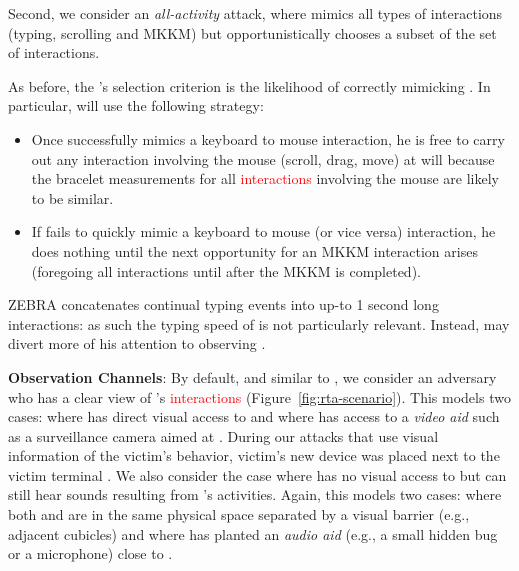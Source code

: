 \documentclass[conference]{IEEEtran}
\newcommand{\zebra}{ZEBRA\xspace}
\newcommand{\allactivity}{all-activity\xspace}
\newcommand{\attacker}{\xspace}
\newcommand{\victim}{\xspace}
\newcommand{\attackedterminal}{\xspace}
\newcommand{\victimdevice}{\xspace}
\newif\ifllncs
\newcommand\changeAsokan[1]{\textcolor{red}{#1}}
\newcommand\changeAsokan[1]{{#1}}
\begin{document}
Second, we consider an \textit{\allactivity} attack, where 
\attacker mimics
all types of interactions (typing, scrolling and MKKM) but
opportunistically chooses a subset of the set of interactions.
\ifllncs
This opportunistic strategy is described in detail in Appendix~\ref{app:extra_attackers}.
\else
As before, the \attacker's selection
criterion is the likelihood of correctly mimicking \victim. In
particular, \attacker will use the following strategy:
\begin{itemize}
\itemsep0em
\item Once \attacker successfully mimics a keyboard to mouse interaction, he
  is free to carry out any interaction involving the mouse (scroll,
  drag, move) at will because the bracelet measurements for all
  \changeAsokan{interactions} involving the mouse are likely to be similar.
\item If \attacker fails to quickly mimic a keyboard to mouse (or vice
  versa) interaction, he
  does nothing until the next opportunity for an MKKM
  interaction arises (foregoing all interactions until after the MKKM
  is completed).
\end{itemize}
\fi


\zebra concatenates continual typing events into up-to 1 second long interactions: as such the typing speed of \attacker is not particularly relevant. Instead, \attacker may divert more of his attention to observing \victim.


\vspace{1mm}
\noindent\textbf{Observation Channels}: By default, and similar to \cite{mare2014zebra}, we consider an adversary \attacker who has a
clear view of \victim's \changeAsokan{interactions} (Figure~\ref{fig:rta-scenario}). This models two cases: where \attacker has direct visual access to \victim and where \attacker has access to a \textit{video aid} such as a surveillance camera aimed at \victimdevice. During our attacks that use visual information of the victim's behavior, victim's new device \victimdevice was placed next to the victim terminal \attackedterminal. We also consider the case where \attacker has no visual access to but can still hear sounds resulting from \victim's activities. Again, this models two cases: where both \victim and \attacker are in the same physical space separated by a visual barrier (e.g., adjacent cubicles) and where \attacker has planted an \textit{audio aid} (e.g., a small hidden bug or a microphone) close to \victimdevice. 
\end{document}
